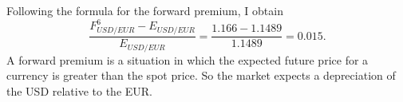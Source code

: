 \documentclass[	11pt, ]{fphw}
\begin{document}
\subsection{}
Following the formula for the forward premium, I obtain 
\[ \frac{F_{USD/EUR}^{6}-E_{USD/EUR}}{E_{USD/EUR}}=\frac{1.166-1.1489}{1.1489}= 0.015. \]
A forward premium is a situation in which the expected future price for a currency is greater than the spot price. So the market expects a depreciation of the USD relative to the EUR.
\end{document}
